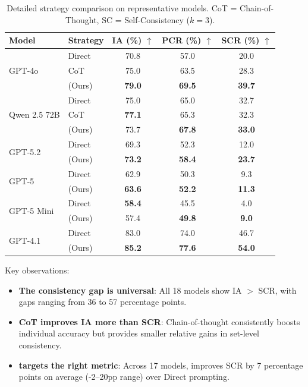 \begin{table}[t]
\caption{Detailed strategy comparison on representative models. CoT = Chain-of-Thought, SC = Self-Consistency ($k{=}3$).}
\label{tab:strategies}
\begin{center}
\small
\begin{tabular}{llccc}
\toprule
\textbf{Model} & \textbf{Strategy} & \textbf{IA (\%)} $\uparrow$ & \textbf{PCR (\%)} $\uparrow$ & \textbf{SCR (\%)} $\uparrow$ \\
\midrule
\multirow{3}{*}{GPT-4o}
 & Direct & 70.8 & 57.0 & 20.0 \\
 & CoT & 75.0 & 63.5 & 28.3 \\
 & \method{} (Ours) & \textbf{79.0} & \textbf{69.5} & \textbf{39.7} \\
\midrule
\multirow{3}{*}{Qwen 2.5 72B}
 & Direct & 75.0 & 65.0 & 32.7 \\
 & CoT & \textbf{77.1} & 65.3 & 32.3 \\
 & \method{} (Ours) & 73.7 & \textbf{67.8} & \textbf{33.0} \\
\midrule
\multirow{2}{*}{GPT-5.2}
 & Direct & 69.3 & 52.3 & 12.0 \\
 & \method{} (Ours) & \textbf{73.2} & \textbf{58.4} & \textbf{23.7} \\
\midrule
\multirow{2}{*}{GPT-5}
 & Direct & 62.9 & 50.3 & 9.3 \\
 & \method{} (Ours) & \textbf{63.6} & \textbf{52.2} & \textbf{11.3} \\
\midrule
\multirow{2}{*}{GPT-5 Mini}
 & Direct & \textbf{58.4} & 45.5 & 4.0 \\
 & \method{} (Ours) & 57.4 & \textbf{49.8} & \textbf{9.0} \\
\midrule
\multirow{2}{*}{GPT-4.1}
 & Direct & 83.0 & 74.0 & 46.7 \\
 & \method{} (Ours) & \textbf{85.2} & \textbf{77.6} & \textbf{54.0} \\
\bottomrule
\end{tabular}
\end{center}
\end{table}

Key observations:
\begin{itemize}
    \item \textbf{The consistency gap is universal}: All 18 models show IA $>$ SCR, with gaps ranging from 36 to 57 percentage points.
    \item \textbf{CoT improves IA more than SCR}: Chain-of-thought consistently boosts individual accuracy but provides smaller relative gains in set-level consistency.
    \item \textbf{\method{} targets the right metric}: Across 17 models, \method{} improves SCR by 7 percentage points on average (-2--20pp range) over Direct prompting.
\end{itemize}